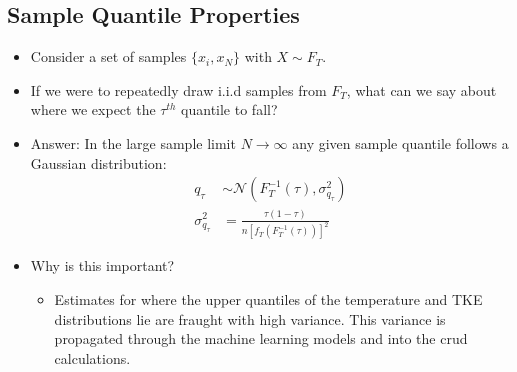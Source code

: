 \documentclass[t, pdftex]{beamer}
\begin{document}
\subsection*{Sample Quantile Properties}
\begin{frame}
\begin{itemize}
    \item Consider a set of samples $\{x_i, x_N \}$ with $X \sim F_T$.
    \item If we were to repeatedly draw i.i.d samples from $F_T$, what can we say about where we expect the $\tau^{th}$ quantile to fall?
    \item Answer:  In the large sample limit $N \rightarrow \infty$ any given sample quantile follows a Gaussian distribution:
    \begin{align}
    q_\tau &\sim \mathcal N \left( F_T^{-1}(\tau), \sigma^2_{q_\tau} \right) \nonumber \\
    \sigma^2_{q_\tau} &= \frac{\tau(1 - \tau)}{n[f_T(F_T^{-1}(\tau))]^2} \nonumber
    \label{eq:theory_qdist_1}
    \end{align}
    
    \item Why is this important?
    \begin{itemize}
        \item Estimates for where the upper quantiles of the temperature and TKE distributions lie are fraught with high variance.  This variance is propagated through the machine learning models and into the crud calculations.
    \end{itemize}
\end{itemize}
\end{frame}

\end{document}
